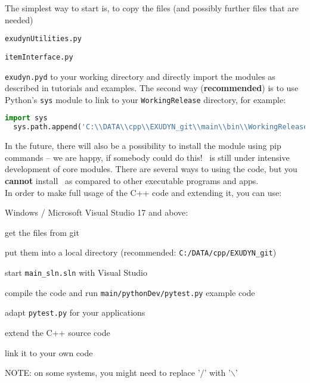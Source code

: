 The simplest way to start is, to copy the files (and possibly further files that are needed)
\bi
  \item \texttt{exudynUtilities.py}
  \item \texttt{itemInterface.py}
  \item \texttt{exudyn.pyd}
\ei
to your working directory and directly import the modules as described in tutorials and examples.
The second way ({\bf recommended}) is to use Python's \texttt{sys} module to link to your \texttt{WorkingRelease} directory, for example:\vspace{6pt}\\
\pythonstyle
\begin{lstlisting}[language=Python, firstnumber=1]
  import sys
  sys.path.append('C:\\DATA\\cpp\\EXUDYN_git\\main\\bin\\WorkingRelease')
\end{lstlisting}
In the future, there will also be a possibility to install the module using pip commands -- we are happy, if somebody could do this!
%
\codeName\ is still under intensive development of core modules.
There are several ways to using the code, but you {\bf cannot} install \codeName\ as compared to other executable programs and apps.
\vspace{6pt}\\
In order to make full usage of the C++ code and extending it, you can use:
\bi
	\item Windows / Microsoft Visual Studio 17 and above:
	\bi
		\item get the files from git
		\item put them into a local directory (recommended: \texttt{C:/DATA/cpp/EXUDYN\_git})
		\item start \texttt{main\_sln.sln} with Visual Studio
		\item compile the code and run \texttt{main/pythonDev/pytest.py} example code
		\item adapt \texttt{pytest.py} for your applications
		\item extend the C++ source code
		\item link it to your own code
		\item NOTE: on some systems, you might need to replace '$/$' with '$\backslash$'

